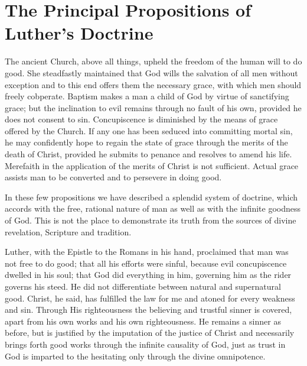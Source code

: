 \section{The Principal Propositions of Luther’s Doctrine}

The ancient Church, above all things, upheld the freedom of the
human will to do good. She steadfastly maintained that God wills
the salvation of all men without exception and to this end offers
them the necessary grace, with which men should freely cobperate.
Baptism makes a man a child of God by virtue of sanctifying grace;
but the inclination to evil remains through no fault of his own, provided
he does not consent to sin. Concupiscence is diminished by the
means of grace offered by the Church. If any one has been seduced
into committing mortal sin, he may confidently hope to regain the
state of grace through the merits of the death of Christ, provided he
submits to penance and resolves to amend his life. Merefaith in the
application of the merits of Christ is not sufficient. Actual grace
assists man to be converted and to persevere in doing good.

In these few propositions we have described a splendid system
of doctrine, which accords with the free, rational nature of man
as well as with the infinite goodness of God. This is not the place to
demonstrate its truth from the sources of divine revelation, Scripture
and tradition.

Luther, with the Epistle to the Romans in his hand, proclaimed
that man was not free to do good; that all his efforts were sinful,
because evil concupiscence dwelled in his soul; that God did everything
in him, governing him as the rider governs his steed. He did
not differentiate between natural and supernatural good. Christ,
he said, has fulfilled the law for me and atoned for every weakness
and sin. Through His righteousness the believing and trustful sinner
is covered, apart from his own works and his own righteousness. He
remains a sinner as before, but is justified by the imputation of the
justice of Christ and necessarily brings forth good works through
the infinite causality of God, just as trust in God is imparted to the
hesitating only through the divine omnipotence.

